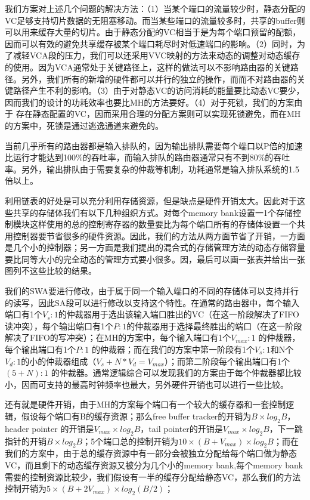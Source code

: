 \documentclass[10pt,journal]{IEEEtran}
\begin{document}
我们方案对上述几个问题的解决方法：（1）当某个端口的流量较少时，静态分配的VC足够支持切片数据的无阻塞移动。而当某些端口的流量较多时，共享的buffer则可以用来缓存大量的切片。由于静态分配的VC相当于是为每个端口预留的配额，因而可以有效的避免共享缓存被某个端口耗尽时对低速端口的影响。（2）同时，为了减轻VCA段的压力，我们可以还采用VVC映射的方法来动态的调整对动态缓存的使用。因为VCA通常处于关键路径上，这样的做法可以不影响路由器的关键路径。另外，我们所有的新增的硬件都可以并行的独立的操作，而而不对路由器的关键路径产生不利的影响。（3）由于对静态VC的访问消耗的能量要比动态VC要少，因而我们的设计的功耗效率也要比MH的方法要好。（4）对于死锁，我们的方案由于 存在静态配置的VC，因而采用合理的分配方案则可以实现死锁避免，而在MH的方案中，死锁是通过逃逸通道来避免的。

当前几乎所有的路由器都是输入排队的，因为输出排队需要每个端口以P倍的加速比运行才能达到100\%的吞吐率，而输入排队的路由器通常只有不到80\%的吞吐率。另外，输出排队由于需要复杂的仲裁等机制，功耗通常是输入排队系统的1.5倍以上。

利用链表的好处是可以充分利用存储资源，但是缺点是硬件开销太大。因此对于这些共享的存储体我们有以下几种组织方式。对每个memory bank设置一1个存储控制模块这样使用的总的控制寄存器的数量要比为每个端口所有的存储体设置一个共用控制器要节省很多的硬件资源。因此，我们的方法从两方面节省了开销，一方面是几个小的控制器；另一方面是我们提出的混合式的存储管理方法的动态存储容量要比同等大小的完全动态的管理方式要小很多。因，最后可以画一张表并给出一张图列不这些比较的结果。

我们的SWA要进行修改，由于属于同一个输入端口的不同的存储体可以支持并行的读写，因此SA段可以进行修改以支持这个特性。在通常的路由器中，每个输入端口有1个$V_s:1$的仲裁器用于选出该输入端口胜出的VC（在这一阶段解决了FIFO读冲突），每个输出端口有1个$P:1$的仲裁器用于选择最终胜出的端口（在这一阶段解决了FIFO的写冲突）；在MH的方案中，每个输入端口有1个$V_{max}:1$ 的仲裁器，每个输出端口有1个$P:1$ 的仲裁器；而在我们的方案中第一阶段有1个$V_s:1$和N个$V_d:1$的小的仲裁器组成（$V_s+N*V_d=V_{max}$）；而第二阶段每个输出端口有1个$(5+N):1$ 的仲裁器。通常逻辑综合可以发现我们的方案由于每个仲裁器都比较小，因而可支持的最高时钟频率也最大，另外硬件开销也可以进行一些比较。

还有就是硬件开销，由于MH的方案每个端口有一个较大的缓存器和一套控制逻辑，假设每个端口有B的缓存资源；那么free buffer tracker的开销为$B\times log_2 B$，header pointer 的开销是$V_{max}\times log_2 B$，tail pointer的开销是$V_{max}\times log_2 B$，下一跳指针的开销$B\times log_2 B$；5个端口总的控制开销为$10\times(B+V_{max})\times log_2B$；而在我们的方案中，由于总的缓存资源中有一部分会被独立分配给每个端口做为静态VC，而且剩下的动态缓存资源又被分为几个小的memory bank,每个memory bank需要的控制资源比较少，我们假设有一半的缓存分配给静态VC，那么我们的方法控制开销为$5\times(B+2V_{max})\times log_2(B/2)$；
\end{document}

